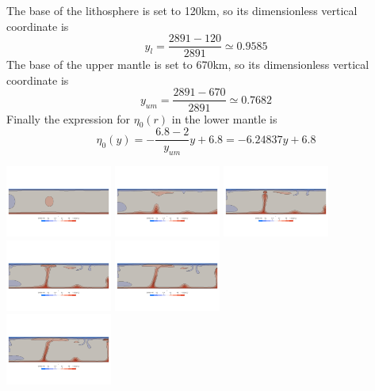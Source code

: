 The base of the lithosphere is set to 120km, so its dimensionless
vertical coordinate is 
\[
y_l = \frac{2891-120}{2891} \simeq 0.9585
\] 
The base of the upper mantle is set to 670km, so its dimensionless
vertical coordinate is 
\[
y_{um} = \frac{2891-670}{2891} \simeq 0.7682
\] 
Finally the expression for $\eta_0(r)$ in the lower mantle 
is 
\[
\eta_0(y)= - \frac{6.8-2}{y_{um}} y + 6.8 = -6.24837 y + 6.8
\]

\begin{center}
\includegraphics[width=3.5cm]{python_codes/fieldstone_88/results/model3/T0000.png}
\includegraphics[width=3.5cm]{python_codes/fieldstone_88/results/model3/T0001.png}
\includegraphics[width=3.5cm]{python_codes/fieldstone_88/results/model3/T0002.png}
\includegraphics[width=3.5cm]{python_codes/fieldstone_88/results/model3/T0003.png}
\includegraphics[width=3.5cm]{python_codes/fieldstone_88/results/model3/T0004.png}\\
\includegraphics[width=3.5cm]{python_codes/fieldstone_88/results/model3/T0005.png}

\end{center}
